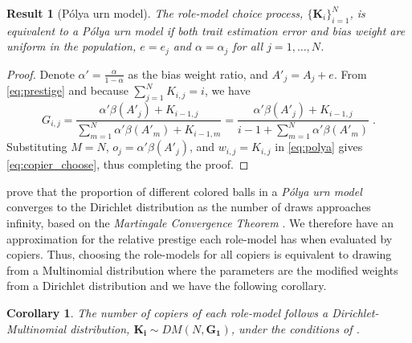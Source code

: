 \documentclass[12pt]{extarticle}
\let\vec\mathbf
\newtheorem{corollary}{Corollary}
\newtheorem{result}{Result}
\begin{document}
\begin{result}[P{\'{o}}lya urn model]\label{result:polya}
The role-model choice process, $\big\{\vec{K}_i\big\}_{i=1}^N$, is equivalent to a \textit{P\'{o}lya urn model} if both trait estimation error and bias weight are uniform in the population, $e=e_j$ and $\alpha=\alpha_j$ for all $j=1,\ldots,N$.
\end{result}

\begin{proof} 
Denote $\alpha'=\frac{\alpha}{1-\alpha}$ as the bias weight ratio, and $A'_j=A_j+e$. From \cref{eq:prestige} and because $\sum_{j=1}^{N}{K_{i,j}}=i$, we have
\begin{equation}\label{eq:copier_choose}
G_{i,j} = 
\frac{\alpha'\beta(A'_j) + K_{i-1,j}}{\sum\limits_{m=1}^{N} \alpha'\beta(A'_m) + K_{i-1,m}}
 =\frac{\alpha'\beta(A'_j) + K_{i-1,j}}{i-1 + \sum\limits_{m=1}^{N}\alpha'\beta(A'_m)} \;.
\end{equation}
Substituting $M=N$, $o_j = \alpha'\beta(A'_j)$, and $w_{i,j} = K_{i,j}$ in \cref{eq:polya} gives \cref{eq:copier_choose}, thus completing the proof.
\end{proof} 

\citet[section 2]{dirichlet} prove that the proportion of different colored balls in a \textit{P\'{o}lya urn model} converges to the Dirichlet distribution as the number of draws approaches infinity, based on the \textit{Martingale Convergence Theorem} \citep{martingaleBook}.
We therefore have an approximation for the relative prestige each role-model has when evaluated by copiers. Thus, choosing the role-models for all copiers is equivalent to drawing from a Multinomial distribution where the parameters are the modified weights from a Dirichlet distribution and we have the following corollary.
\\

\begin{corollary}\label{cor:dirichlet}
The number of copiers of each role-model follows a Dirichlet-Multinomial distribution, $\vec{K_i} \sim \textit{DM}(N,\vec{G_1})$, under the conditions of .
\end{corollary}
\end{document}
